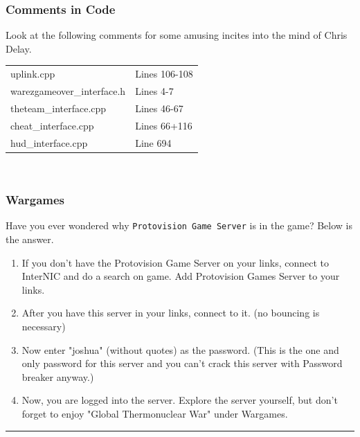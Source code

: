 \documentclass[11pt,twoside,a4paper]{book}
\begin{document}
\subsubsection{Comments in Code}

Look at the following comments for some amusing incites into the mind of Chris Delay. ~\\
\begin{tabular}[ht]{ p{5cm} p{5cm} }
	uplink.cpp					&	Lines 106-108	\\
	warezgameover\_interface.h	&	Lines 4-7		\\
	theteam\_interface.cpp		&	Lines 46-67		\\
	cheat\_interface.cpp		&	Lines 66+116	\\
	hud\_interface.cpp			&	Line 694		\\
\end{tabular}~\\

\subsubsection{Wargames}

Have you ever wondered why \texttt{Protovision Game Server} is in the game? Below is the answer.
\begin{enumerate}
	\item If you don't have the Protovision Game Server on your links, connect to InterNIC and do a search on game. Add Protovision Games Server to your links.
	\item After you have this server in your links, connect to it. (no bouncing is necessary)
	\item Now enter "joshua" (without quotes) as the password. (This is the one and only password for this server and you can't crack this server with Password breaker anyway.)
	\item Now, you are logged into the server. Explore the server yourself, but don't forget to enjoy "Global Thermonuclear War" under Wargames.
\end{enumerate}

\begin{center} \rule{0.85\textwidth}{0.01cm} \end{center}

\clearpage
\end{document}
